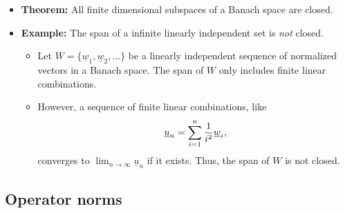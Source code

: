 \documentclass[11pt,twoside]{report}
\newcommand{\vecnot}{\underline}
\begin{document}
\begin{itemize}
\item \textbf{Theorem:}  All finite dimensional subspaces of a Banach space are closed.


\item \textbf{Example:} The span of a infinite linearly independent set is \emph{not} closed. 
\begin{itemize}
\item Let $W = \{\vecnot{w}_1 ,\vecnot{w}_2 , \ldots \}$ be a linearly independent sequence of normalized vectors in a Banach space.
The span of $W$ only includes finite linear combinations.
\item However, a sequence of finite linear combinations, like \vspace{-2mm}
\[ \vecnot{u}_n = \sum_{i=1}^n \frac{1}{i^2} \vecnot{w}_i , \vspace{-1.5mm} \]  converges to $\lim_{n\to \infty} \vecnot{u}_n$ if it exists. Thus, the span of $W$ is not closed.
\end{itemize}

\end{itemize}




\subsection{Operator norms} 
\end{document}
